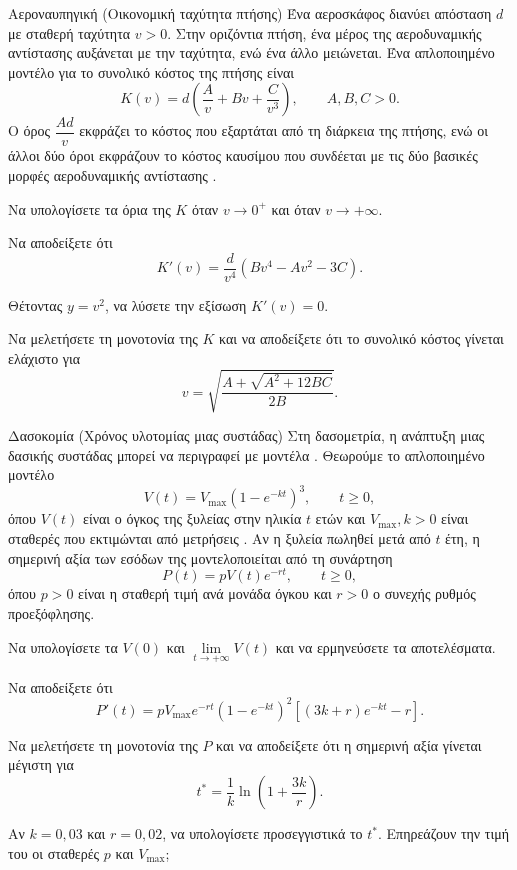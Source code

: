 \begin{problhma}{Αεροναυπηγική (Οικονομική ταχύτητα πτήσης)}
Ένα αεροσκάφος διανύει απόσταση $d$ με σταθερή ταχύτητα $v>0$.
Στην οριζόντια πτήση, ένα μέρος της αεροδυναμικής αντίστασης αυξάνεται
με την ταχύτητα, ενώ ένα άλλο μειώνεται. Ένα απλοποιημένο μοντέλο για
το συνολικό κόστος της πτήσης είναι
\[
  K(v)=d\left(\frac{A}{v}+Bv+\frac{C}{v^3}\right),
  \qquad A,B,C>0.
\]
Ο όρος $\dfrac{Ad}{v}$ εκφράζει το κόστος που εξαρτάται από τη διάρκεια
της πτήσης, ενώ οι άλλοι δύο όροι εκφράζουν το κόστος καυσίμου που
συνδέεται με τις δύο βασικές μορφές αεροδυναμικής αντίστασης
\cite{nasaDragEquation,nasaInducedDrag}.

\begin{alist}
  \item Να υπολογίσετε τα όρια της $K$ όταν $v\to0^+$ και όταν
        $v\to+\infty$.
  \item Να αποδείξετε ότι
        \[
          K'(v)=\frac{d}{v^4}\left(Bv^4-Av^2-3C\right).
        \]
  \item Θέτοντας $y=v^2$, να λύσετε την εξίσωση $K'(v)=0$.
  \item Να μελετήσετε τη μονοτονία της $K$ και να αποδείξετε ότι το
        συνολικό κόστος γίνεται ελάχιστο για
        \[
          v=
          \sqrt{\frac{A+\sqrt{A^2+12BC}}{2B}}.
        \]
\end{alist}
\end{problhma}

\begin{problhma}{Δασοκομία (Χρόνος υλοτομίας μιας συστάδας)}
Στη δασομετρία, η ανάπτυξη μιας δασικής συστάδας μπορεί να περιγραφεί
με μοντέλα . Θεωρούμε το απλοποιημένο μοντέλο
\[
  V(t)=V_{\max}\left(1-e^{-kt}\right)^3,
  \qquad t\geq0,
\]
όπου $V(t)$ είναι ο όγκος της ξυλείας στην ηλικία $t$ ετών και
$V_{\max},k>0$ είναι σταθερές που εκτιμώνται από μετρήσεις
\cite{fekedulegn1999growthModels}. Αν η ξυλεία πωληθεί μετά από $t$ έτη, η σημερινή αξία των εσόδων της
μοντελοποιείται από τη συνάρτηση
\[
  P(t)=pV(t)e^{-rt},
  \qquad t\geq0,
\]
όπου $p>0$ είναι η σταθερή τιμή ανά μονάδα όγκου και $r>0$ ο συνεχής
ρυθμός προεξόφλησης.

\begin{alist}
  \item Να υπολογίσετε τα $V(0)$ και
        $\displaystyle\lim\limits_{t\to+\infty}V(t)$ και να ερμηνεύσετε τα
        αποτελέσματα.
  \item Να αποδείξετε ότι
        \[
          P'(t)=pV_{\max}e^{-rt}
          \left(1-e^{-kt}\right)^2
          \left[(3k+r)e^{-kt}-r\right].
        \]
  \item Να μελετήσετε τη μονοτονία της $P$ και να αποδείξετε ότι η
        σημερινή αξία γίνεται μέγιστη για
        \[
          t^*=\frac{1}{k}\ln\left(1+\frac{3k}{r}\right).
        \]
  \item Αν $k=0{,}03$ και $r=0{,}02$, να υπολογίσετε προσεγγιστικά το
        $t^*$. Επηρεάζουν την τιμή του οι σταθερές $p$ και $V_{\max}$;
\end{alist}
\end{problhma}


